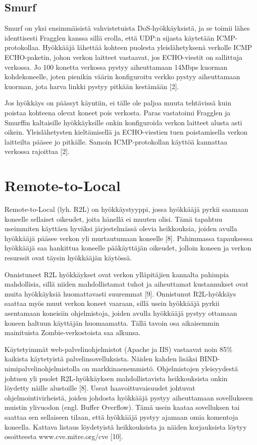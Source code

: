 \subsection{Smurf}

Smurf on yksi ensimmäisistä vahvistetuista DoS-hyökkäyksistä, ja se
toimii lähes identtisesti Fragglen kanssa sillä erolla, että UDP:n
sijasta käytetään ICMP-protokollaa. Hyökkääjä lähettää kohteen
puolesta yleislähetyksenä verkolle ICMP ECHO-paketin, johon verkon
laitteet vastaavat, jos ECHO-viestit on sallittuja verkossa. Jo 100
konetta verkossa pystyy aiheuttamaan 14Mbps kuorman kohdekoneelle,
joten pienikin väärin konfiguroitu verkko pystyy aiheuttamaan kuorman,
jota harva linkki pystyy pitkään kestämään [2].

Jos hyökkäys on päässyt käyntiin, ei tälle ole paljoa muuta tehtävissä
kuin poistaa kohteena olevat koneet pois verkosta. Paras vastatoimi
Fragglen ja Smurffin kaltaisille hyökkäyksille onkin konfiguroida
verkon laitteet alusta asti oikein. Yleislähetysten kieltämisellä ja
ECHO-viestien tuen poistamisella verkon laitteilta pääsee jo
pitkälle. Samoin ICMP-protokollan käyttöä kannattaa verkossa rajoittaa
[2].

\section{Remote-to-Local}

Remote-to-Local (lyh. R2L) on hyökkäystyyppi, jossa hyökkääjä pyrkii
saamaan koneelle sellaiset oikeudet, joita hänellä ei muuten
olisi. Tämä tapahtuu useimmiten käyttäen hyväksi järjestelmässä olevia
heikkouksia, joiden avulla hyökkääjä pääsee verkon yli murtautumaan
koneelle [8]. Pahimmassa tapauksessa hyökkääjä saa hankittua koneelle
pääkäyttäjän oikeudet, jolloin koneen ja verkon resurssit ovat täysin
hyökkääjän käytössä.

Onnistuneet R2L hyökkäykset ovat verkon ylläpitäjien kannalta pahimpia
mahdollisia, sillä niiden mahdollistamat tuhot ja aiheuttamat
kustannukset ovat muita hyökkäyksiä huomattavasti suuremmat
[9]. Onnistunut R2L-hyökkäys saattaa myös muut verkon koneet vaaraan,
sillä usein hyökkääjä pyrkii asentamaan koneisiin ohjelmistoja, joiden
avulla hyökkääjä pystyy ottamaan koneen haltuun käyttäjän
huomaamatta. Tällä tavoin osa aikaisemmin mainituista
Zombie-verkostoista saa alkunsa.

Käytetyimmät web-palvelinohjelmistot (Apache ja IIS) vastaavat noin
85\% kaikista käytetyistä palvelinsovelluksista. Näiden kahden lisäksi
BIND-ni\-mi\-pal\-ve\-lin\-oh\-jel\-mis\-tol\-la on markkinaenemmistö. Ohjelmistojen
yleisyydestä johtuen yli puolet R2L-hyökkäyksen mahdollistavista
heikkouksista onkin löydetty näille alustoille [8]. Useat
haavoittuvaisuudet johtuvat ohjelmointivirheistä, joiden johdosta
hyökkääjä pystyy aiheuttamaan sovellukseen muistin ylivuodon
(engl. Buffer Overflow). Tämä usein kaataa sovelluksen tai saattaa sen
sellaiseen tilaan, että hyökkääjä pystyy ajamaan omia komentoja
koneella. Kattava listaus löydetyistä heikkouksista ja näiden
korjauksista löytyy osoitteesta www.cve.mitre.org/cve [10].

